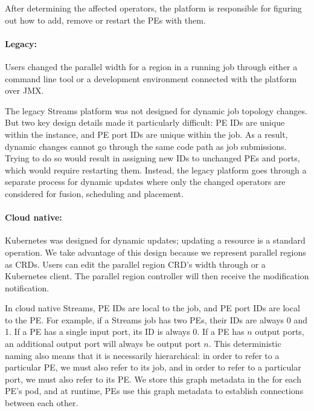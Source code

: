 After determining the affected operators, the platform is responsible for
figuring out how to add, remove or restart the PEs with them.

\paragraph{Legacy:} Users changed the parallel width for a region in a running
job through either a command line tool or a development environment connected
with the platform over JMX.

The legacy Streams platform was not designed for dynamic job topology changes.
But two key design details made it particularly difficult: PE IDs are unique
within the instance, and PE port IDs are unique within the job. As a result,
dynamic changes cannot go through the same code path as job submissions.  Trying
to do so would result in assigning new IDs to unchanged PEs and ports, which
would require restarting them. Instead, the legacy platform goes through a
separate process for dynamic updates where only the changed operators are
considered for fusion, scheduling and placement.

\paragraph{Cloud native:} Kubernetes was designed for dynamic updates; updating
a resource is a standard operation. We take advantage of this design because we
represent parallel regions as CRDs. Users can edit the parallel region CRD's
width through  or a Kubernetes client. The parallel region
controller will then receive the modification notification.

In cloud native Streams, PE IDs are local to the job, and PE port IDs are local
to the PE. For example, if a Streams job has two PEs, their IDs are always 0 and
1. If a PE has a single input port, its ID is always 0. If a PE has $n$ output
ports, an additional output port will always be output port $n$. This
deterministic naming also means that it is necessarily hierarchical: in order to
refer to a particular PE, we must also refer to its job, and in order to refer
to a particular port, we must also refer to its PE.  We store this graph
metadata in the  for each PE's pod, and at runtime, PEs use this
graph metadata to establish connections between each other.


